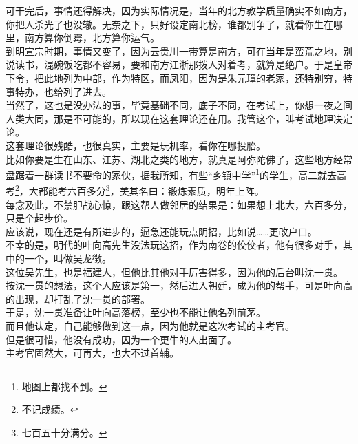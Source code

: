 \begin{multicols}{\theparacolNo}
可干完后，事情还得解决，因为实际情况是，当年的北方教学质量确实不如南方，你把人杀光了也没辙。无奈之下，只好设定南北榜，谁都别争了，就看你生在哪里，南方算你倒霉，北方算你运气。\\

到明宣宗时期，事情又变了，因为云贵川一带算是南方，可在当年是蛮荒之地，别说读书，混碗饭吃都不容易，要和南方江浙那拨人对着考，就算是绝户。于是皇帝下令，把此地列为中部，作为特区，而凤阳，因为是朱元璋的老家，还特别穷，特事特办，也给列了进去。\\

当然了，这也是没办法的事，毕竟基础不同，底子不同，在考试上，你想一夜之间人类大同，那是不可能的，所以现在这套理论还在用。我管这个，叫考试地理决定论。\\

这套理论很残酷，也很真实，主要是玩机率，看你在哪投胎。\\

比如你要是生在山东、江苏、湖北之类的地方，就真是阿弥陀佛了，这些地方经常盘踞着一群读书不要命的家伙，据我所知，有些“乡镇中学”\footnote{地图上都找不到。}的学生，高二就去高考\footnote{不记成绩。}，大都能考六百多分\footnote{七百五十分满分。}，美其名曰：锻炼素质，明年上阵。\\

每念及此，不禁胆战心惊，跟这帮人做邻居的结果是：如果想上北大，六百多分，只是个起步价。\\

应该说，现在还是有所进步的，逼急还能玩点阴招，比如说……更改户口。\\

不幸的是，明代的叶向高先生没法玩这招，作为南卷的佼佼者，他有很多对手，其中的一个，叫做吴龙徴。\\

这位吴先生，也是福建人，但他比其他对手厉害得多，因为他的后台叫沈一贯。\\

按沈一贯的想法，这个人应该是第一，然后进入朝廷，成为他的帮手，可是叶向高的出现，却打乱了沈一贯的部署。\\

于是，沈一贯准备让叶向高落榜，至少也不能让他名列前茅。\\

而且他认定，自己能够做到这一点，因为他就是这次考试的主考官。\\

但是很可惜，他没有成功，因为一个更牛的人出面了。\\

主考官固然大，可再大，也大不过首辅。\\


\end{multicols}
